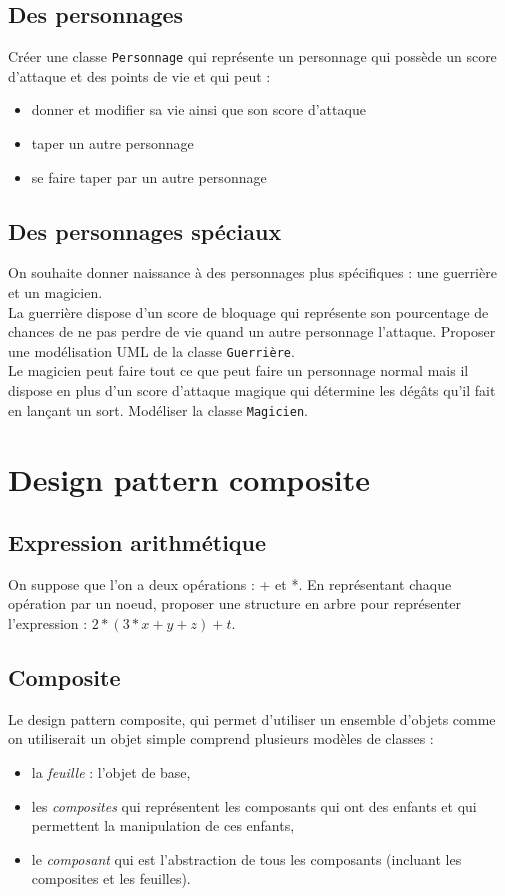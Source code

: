 \documentclass[12pt]{article}
\begin{document}
\subsection{Des personnages}
Créer une classe \texttt{Personnage} qui représente un personnage qui possède un score d'attaque et des points de vie et qui peut :
\begin{itemize}
	\item donner et modifier sa vie ainsi que son score d'attaque
	\item taper un autre personnage
	\item se faire taper par un autre personnage
\end{itemize}

\subsection{Des personnages spéciaux}
On souhaite donner naissance à des personnages plus spécifiques : une guerrière et un magicien.\\
La guerrière dispose d'un score de bloquage qui représente son pourcentage de chances de ne pas perdre de vie quand un autre personnage l'attaque. Proposer une modélisation UML de la classe \texttt{Guerrière}. \\
Le magicien peut faire tout ce que peut faire un personnage normal mais il dispose en plus d'un score d'attaque magique qui détermine les dégâts qu'il fait en lançant un sort. Modéliser la classe \texttt{Magicien}.

\section{Design pattern composite}
\subsection{Expression arithmétique}
On suppose que l'on a deux opérations : + et *. En représentant chaque opération par un noeud, proposer une structure en arbre pour représenter l'expression : $2*(3*x+y+z)+t$.

\subsection{Composite}
Le design pattern composite, qui permet d'utiliser un ensemble d'objets comme on utiliserait un objet simple comprend plusieurs modèles de classes :
\begin{itemize}
	\item la \emph{feuille} : l'objet de base,
	\item les \emph{composites} qui représentent les composants qui ont des enfants et qui permettent la manipulation de ces enfants,
	\item le \emph{composant} qui est l'abstraction de tous les composants (incluant les composites et les feuilles).
\end{itemize}
\end{document}
